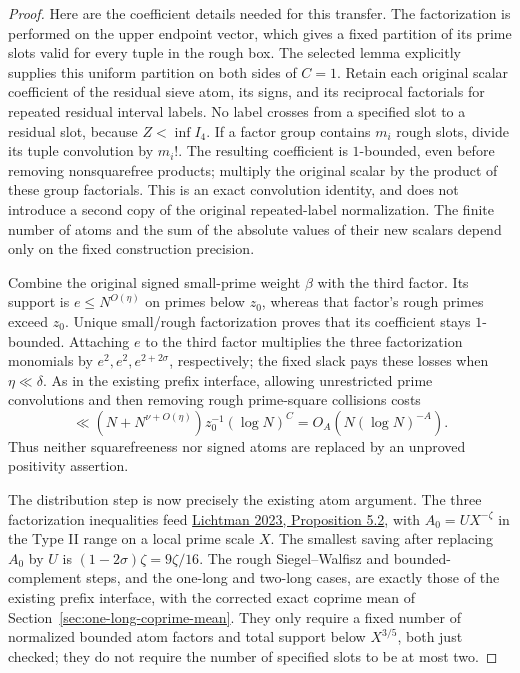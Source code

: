 \documentclass[11pt]{article}
\begin{document}
\begin{proof}
Here are the coefficient details needed for this transfer.  The
factorization is performed on the upper endpoint vector, which
gives a fixed partition of its prime slots valid for every tuple
in the rough box.  The selected lemma explicitly supplies this
uniform partition on both sides of $C=1$.  Retain each original
scalar coefficient of the residual sieve atom, its signs, and its
reciprocal factorials for repeated residual interval labels.
No label crosses from a specified slot to a residual slot, because
$Z<\inf I_4$.  If a factor group contains $m_i$ rough slots,
divide its tuple convolution by $m_i!$.  The resulting coefficient
is $1$-bounded, even before removing nonsquarefree products; multiply
the original scalar by the product of these group factorials.
This is an exact convolution identity, and does not introduce a
second copy of the original repeated-label normalization.
The finite number of atoms and the sum of the absolute values of
their new scalars depend only on the fixed construction precision.

Combine the original signed small-prime weight $\beta$ with the
third factor.  Its support is $e\le N^{O(\eta)}$ on primes below
$z_0$, whereas that factor's rough primes exceed $z_0$.
Unique small/rough factorization proves that its coefficient stays
$1$-bounded.  Attaching $e$ to the third factor multiplies the three
factorization monomials by $e^2,e^2,e^{2+2\sigma}$, respectively;
the fixed slack pays these losses when $\eta\ll\delta$.
As in the existing prefix interface, allowing unrestricted prime
convolutions and then removing rough prime-square collisions costs
\[
 \ll (N+N^{\nu+O(\eta)})z_0^{-1}(\log N)^{C}
   =O_A(N(\log N)^{-A}).
\]
Thus neither squarefreeness nor signed atoms are replaced by an
unproved positivity assertion.

The distribution step is now precisely the existing atom argument.
The three factorization inequalities feed
\href{https://arxiv.org/html/2309.08522v1}{Lichtman 2023,
Proposition 5.2}, with $A_0=UX^{-\zeta}$ in the Type II range
on a local prime scale $X$.
The smallest saving after replacing $A_0$ by $U$ is
$(1-2\sigma)\zeta=9\zeta/16$.
The rough Siegel--Walfisz and bounded-complement steps, and the
one-long and two-long cases, are exactly those of the existing
prefix interface, with the corrected exact coprime mean of
Section~\ref{sec:one-long-coprime-mean}.
They only require a fixed number of normalized bounded atom factors
and total support below $X^{3/5}$, both just checked; they do not
require the number of specified slots to be at most two.


\end{proof}
\end{document}
